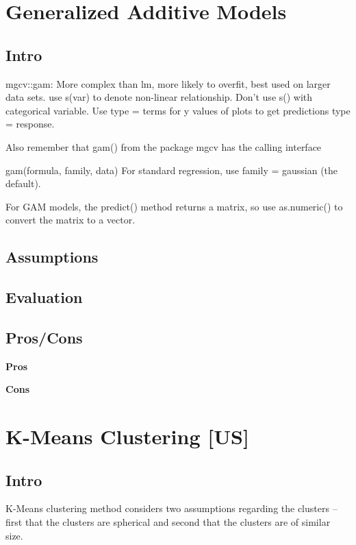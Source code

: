 \documentclass[]{book}
\begin{document}
\section{Generalized Additive Models}\label{generalized-additive-models}

\subsection{Intro}\label{intro}

mgcv::gam: More complex than lm, more likely to overfit, best used on
larger data sets. use s(var) to denote non-linear relationship. Don't
use s() with categorical variable. Use type = terms for y values of
plots to get predictions type = response.

Also remember that gam() from the package mgcv has the calling interface

gam(formula, family, data) For standard regression, use family =
gaussian (the default).

For GAM models, the predict() method returns a matrix, so use
as.numeric() to convert the matrix to a vector.

\subsection{Assumptions}\label{assumptions}

\subsection{Evaluation}\label{evaluation}

\subsection{Pros/Cons}\label{proscons}

\textbf{Pros}

\textbf{Cons}

\section{K-Means Clustering {[}US{]}}\label{k-means-clustering-us}

\subsection{Intro}\label{intro-1}

K-Means clustering method considers two assumptions regarding the
clusters -- first that the clusters are spherical and second that the
clusters are of similar size.
\end{document}
